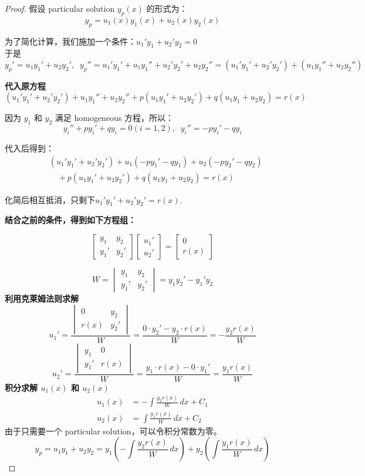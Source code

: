 \documentclass[12pt]{article}
\begin{document}
\begin{proof}
假设 particular solution \( y_p(x) \) 的形式为：
\[y_p = u_1(x) y_1(x) + u_2(x) y_2(x)\]

为了简化计算，我们施加一个条件：$u_1' y_1 + u_2' y_2 = 0$
\\于是 \[y_p' = u_1 y_1' + u_2 y_2',
\;\;y_p'' = u_1' y_1' + u_1 y_1'' + u_2' y_2' + u_2 y_2'' = (u_1' y_1' + u_2' y_2') + (u_1 y_1'' + u_2 y_2'')\]

\textbf{代入原方程}
\[(u_1' y_1' + u_2' y_2') + u_1 y_1'' + u_2 y_2'' + p(u_1 y_1' + u_2 y_2') + q(u_1 y_1 + u_2 y_2) = r(x)\]

因为 \( y_1 \) 和 \( y_2 \) 满足 homogeneous 方程，所以：
\[y_i'' + p y_i' + q y_i = 0 (i = 1, 2), \;\;y_i'' = -p y_i' - q y_i\]

代入后得到：
\[\begin{aligned}
& (u_1' y_1' + u_2' y_2') + u_1 (-p y_1' - q y_1) + u_2 (-p y_2' - q y_2) \\
& \quad + p(u_1 y_1' + u_2 y_2') + q(u_1 y_1 + u_2 y_2) = r(x)
\end{aligned}\]

化简后相互抵消，只剩下$u_1' y_1' + u_2' y_2' = r(x)$.

\textbf{结合之前的条件，得到如下方程组：}

\[\begin{bmatrix}y_1 & y_2 \\y_1' & y_2'\end{bmatrix}
\begin{bmatrix}u_1' \\u_2'\end{bmatrix}=
\begin{bmatrix}0 \\r(x)\end{bmatrix}\]

\[W = \begin{vmatrix}y_1 & y_2 \\y_1' & y_2'\end{vmatrix} = y_1 y_2' - y_1' y_2\]
\textbf{利用克莱姆法则求解}
\[u_1' = \frac{\begin{vmatrix}0 & y_2 \\r(x) & y_2'\end{vmatrix}}{W} = \frac{0 \cdot y_2' - y_2 \cdot r(x)}{W} = -\frac{y_2 r(x)}{W}\]
\[u_2' = \frac{\begin{vmatrix}y_1 & 0 \\y_1' & r(x)
\end{vmatrix}}{W} = \frac{y_1 \cdot r(x) - 0 \cdot y_1'}{W} = \frac{y_1 r(x)}{W}\]
\textbf{积分求解 \( u_1(x) \) 和 \( u_2(x) \)}
\[\begin{aligned}
u_1(x) &= -\int \frac{y_2 r(x)}{W} \, dx + C_1 \\
u_2(x) &= \int \frac{y_1 r(x)}{W} \, dx + C_2
\end{aligned}\]
由于只需要一个 particular solution，可以令积分常数为零。
\[y_p = u_1 y_1 + u_2 y_2 = y_1 \left( -\int \frac{y_2 r(x)}{W} \, dx \right) + y_2 \left( \int \frac{y_1 r(x)}{W} \, dx \right)\]
\end{proof}
\end{document}
